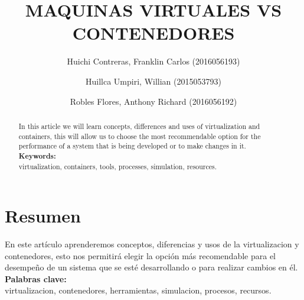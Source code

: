 \documentclass[preprint,12pt]{elsarticle}
\begin{document}
	
	\begin{frontmatter} 

		\title{\huge MAQUINAS VIRTUALES VS CONTENEDORES}
		
		\author{Huichi Contreras, Franklin Carlos            (2016056193)}
		\author{Huillca Umpiri, Willian              		  (2015053793)}
		\author{Robles Flores, Anthony Richard              (2016056192)} 
		\address{Escuela Profesional de Ingeniería de Sistemas}
		\address{Universidad Privada de Tacna}
		\address{Tacna, Perú}
		

		\begin{abstract}
In this article we will learn concepts, differences and uses of virtualization and containers, this will allow us to choose the most recommendable option for the performance of a system that is being developed or to make changes in it.\\
\textbf{Keywords:}  \\
 virtualization, containers, tools, processes, simulation, resources.\\

		\end{abstract}


	\end{frontmatter}


\section{Resumen}


En este artículo aprenderemos conceptos, diferencias y usos de la virtualizacion y contenedores, esto nos permitirá elegir la opción más recomendable para el desempeño de un sistema que se esté desarrollando o para realizar cambios en él.\\

\textbf{Palabras clave:}   \\
virtualizacion, contenedores, herramientas, simulacion, procesos, recursos.\\
\end{document}
